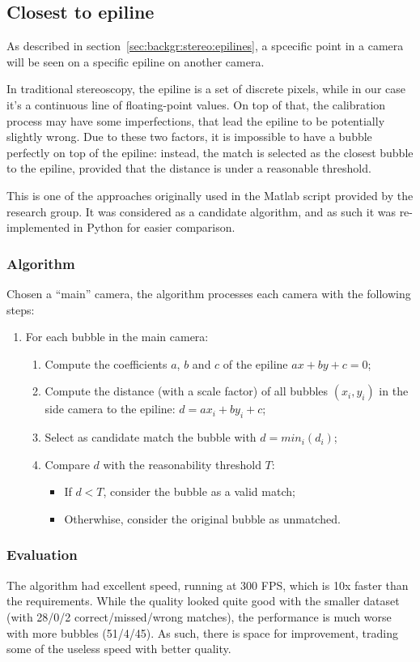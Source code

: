 \subsection{Closest to epiline}
\label{sec:match:epiline}

As described in section~\ref{sec:backgr:stereo:epilines}, a spcecific point in a camera will be seen on a specific epiline on another camera.

In traditional stereoscopy, the epiline is a set of discrete pixels, while in our case it's a continuous line of floating-point values.
On top of that, the calibration process may have some imperfections, that lead the epiline to be potentially slightly wrong.
Due to these two factors, it is impossible to have a bubble perfectly on top of the epiline: instead, the match is selected as the closest bubble to the epiline, provided that the distance is under a reasonable threshold.

This is one of the approaches originally used in the Matlab script provided by the research group.
It was considered as a candidate algorithm, and as such it was re-implemented in Python for easier comparison.

\subsubsection{Algorithm}

Chosen a ``main'' camera, the algorithm processes each camera with the following steps:
\begin{enumerate}
	\itemsep 0em
	\item For each bubble in the main camera:
	      \begin{enumerate}
		      \item Compute the coefficients $a$, $b$ and $c$ of the epiline $ax+by+c{=}0$;
		      \item Compute the distance (with a scale factor) of all bubbles $(x_i, y_i)$ in the side camera to the epiline: $d = ax_i + by_i + c$;
		      \item Select as candidate match the bubble with $d=min_i(d_i)$;
		      \item Compare $d$ with the reasonability threshold $T$:
		            \begin{itemize}
			            \item If $d<T$, consider the bubble as a valid match;
			            \item Otherwhise, consider the original bubble as unmatched.
		            \end{itemize}
	      \end{enumerate}
\end{enumerate}

\subsubsection{Evaluation}

The algorithm had excellent speed, running at 300 FPS, which is 10x faster than the requirements.
While the quality looked quite good with the smaller dataset (with 28/0/2 correct/missed/wrong matches), the performance is much worse with more bubbles (51/4/45).
As such, there is space for improvement, trading some of the useless speed with better quality.
